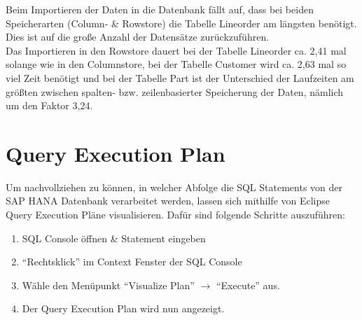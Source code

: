 Beim Importieren der Daten in die Datenbank fällt auf, dass bei beiden Speicherarten (Column- \& Rowstore) die Tabelle Lineorder am längsten benötigt. Dies ist auf die große Anzahl der Datensätze zurückzuführen.\\
Das Importieren in den Rowstore dauert bei der Tabelle Lineorder ca. 2,41 mal solange wie in den Columnstore, bei der Tabelle Customer wird ca. 2,63 mal so viel Zeit benötigt und bei der Tabelle Part ist der Unterschied der Laufzeiten am größten zwischen spalten- bzw. zeilenbasierter Speicherung der Daten, nämlich um den Faktor 3,24. 

\section{Query Execution Plan}
Um nachvollziehen zu können, in welcher Abfolge die SQL Statements von der SAP HANA Datenbank verarbeitet werden, lassen sich mithilfe von Eclipse Query Execution Pläne visualisieren.
Dafür sind folgende Schritte auszuführen:
\begin{enumerate}
	\item SQL Console öffnen \& Statement eingeben
	\item \enquote{Rechtsklick} im Context Fenster der SQL Console
	\item Wähle den Menüpunkt \enquote{Visualize Plan} $\rightarrow$ \enquote{Execute} aus.
	\item Der Query Execution Plan wird nun angezeigt.
\end{enumerate} 
